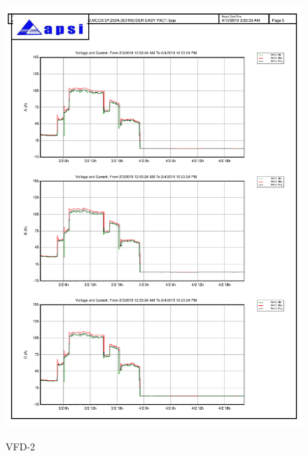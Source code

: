 \begin{figure}[]
		\includegraphics[width=\textwidth]{figures/fig_ch04_elecaudit_load_flow_vfd2.pdf} \\
	\caption{VFD-2 }
	\label{fig_ch04_elecaudit_load_flow_vfd2} 
\end{figure}


